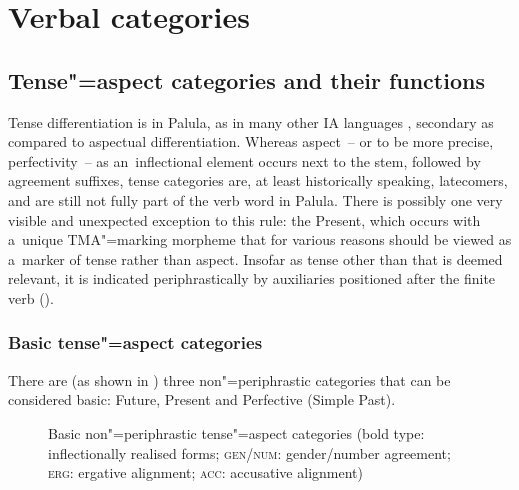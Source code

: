 \chapter{Verbal categories}
\label{chap:9}

\section{Tense"=aspect categories and their functions}
\label{sec:9-1}

Tense differentiation is in Palula, as in many other IA languages \citep[262]{masica1991}, secondary as compared to aspectual differentiation. Whereas aspect~-- or to be more precise, perfectivity~-- as an~inflectional element occurs next to the stem, followed by agreement suffixes, tense categories are, at least historically speaking, latecomers, and are still not fully part of the verb word in Palula. There is possibly one very visible and unexpected exception to this rule: the Present, which occurs with a~unique TMA"=marking morpheme that for various reasons should be viewed as a~marker of tense rather than aspect. Insofar as tense other than that is deemed relevant, it is indicated periphrastically by auxiliaries positioned after the finite verb ().


\subsection{Basic tense"=aspect categories}
\label{subsec:9-1-1}


There are (as shown in ) three non"=periphrastic categories that can be considered basic: Future, Present and Perfective (Simple Past).

\begin{figure}[ht]
\centering
{}
\caption{Basic non"=periphrastic tense"=aspect categories (bold type: inflectionally realised forms;
    \textsc{gen/num}: gender/number agreement; \textsc{erg}: ergative alignment; \textsc{acc}:
    accusative alignment)}
\label{fig:9-1}
\end{figure}

